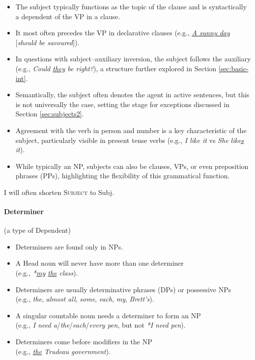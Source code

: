 \begin{itemize}[noitemsep]
    \item {}The subject typically functions as the topic of the clause and is syntactically a dependent of the VP in a clause.
    \item It most often precedes the VP in declarative clauses (e.g., \textit{\uline{A sunny day}} [\textit{should be savoured}]).
    \item In questions with subject--auxiliary inversion, the subject follows the auxiliary (e.g., \textit{Could \uline{they} be right?}), a structure further explored in Section \ref{sec:basic-int}.
    \item Semantically, the subject often denotes the agent in active sentences, but this is not universally the case, setting the stage for exceptions discussed in Section \ref{sec:subjects2}.
    \item {}Agreement with the verb in person and number is a key characteristic of the subject, particularly visible in present tense verbs (e.g., \textit{I like it} vs \textit{She like\uline{s} it}).
    \item While typically an NP, subjects can also be clauses, VPs, or even preposition phrases (PPs), highlighting the flexibility of this grammatical function.
\end{itemize}


I will often shorten \textsc{Subject} to Subj.

\paragraph*{Determiner} \label{sec:determine} (a type of Dependent)

\begin{itemize}[noitemsep]
    \item {}Determiners are found only in NPs.
    \item A Head noun will never have more than one determiner \\(e.g., \textit{*\uline{my} \uline{the} class}).
    \item Determiners are usually determinative phrases (DPs) or possessive NPs \\(e.g., \textit{the}, \textit{almost all}, \textit{ some},\textit{ each},\textit{ my},\textit{ Brett's}).
    \item A singular countable noun needs a determiner to form an NP \\(e.g., \textit{I need a}/\textit{the}/\textit{each}/\textit{every pen}, but not \textit{*I need pen}).
    \item Determiners come before modifiers in the NP \\(e.g., \textit{\uline{the} Trudeau government}).
\end{itemize}

